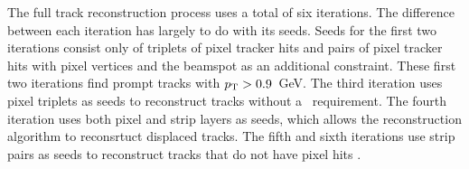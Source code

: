 The full track reconstruction process uses
a total of six iterations.
The difference between each iteration has largely to do
with its seeds.  Seeds for the first two iterations consist only of 
triplets of pixel tracker hits and pairs of pixel tracker hits with pixel
vertices and the beamspot as an additional constraint.  These first two iterations
find prompt tracks with $p_{\text{T}} > 0.9$~GeV.  The third iteration uses pixel triplets 
as seeds to reconstruct tracks without a \pt~requirement.
The fourth iteration uses both pixel and strip layers as seeds, which allows the 
reconstruction algorithm to reconsrtuct displaced tracks.  
The fifth and sixth iterations use strip pairs as seeds to reconstruct tracks
that do not have pixel hits \cite{track-reco-2010}.


